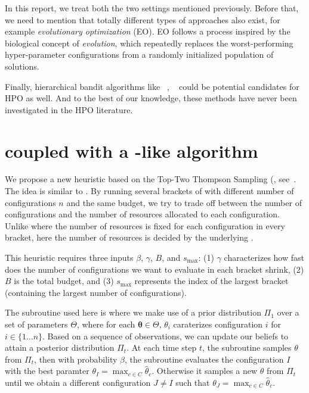 \documentclass[twoside,11pt]{article}
\begin{document}
In this report, we treat both the two settings mentioned previously. Before that, we need to mention that totally different types of approaches also exist, for example \emph{evolutionary optimization} (EO). EO follows a process inspired by the biological concept of \emph{evolution}, which repeatedly replaces the worst-performing hyper-parameter configurations from a randomly initialized population of solutions.

Finally, hierarchical bandit algorithms like \HOO~\citep{bubeck2010x}, \HCT~\citep{azar2014online} could be potential candidates for HPO as well. And to the best of our knowledge, these methods have never been investigated in the HPO literature.

\section{\Hyperband coupled with a \TS-like algorithm}

We propose a new heuristic based on the Top-Two Thompson Sampling (\TTTS, see~\citealt{russo2016ttts}. The idea is similar to \Hyperband. By running several brackets of \TTTS with different number of configurations $n$ and the same budget, we try to trade off between the number of configurations and the number of resources allocated to each configuration. Unlike \Hyperband where the number of resources is fixed for each configuration in every bracket, here the number of resources is decided by the underlying \TS.

This heuristic requires three inputs $\beta$, $\gamma$, $B$, and $s_{\operatorname{max}}$:  (1) $\gamma$ characterizes how fast does the number of configurations we want to evaluate in each bracket shrink, (2) $B$ is the total budget, and (3) $s_{\operatorname{max}}$ represents the index of the largest bracket (containing the largest number of configurations).

The subroutine used here is \TTTS where we make use of a prior distribution $\Pi_1$ over a set of parameters $\Theta$, where for each $\mathbf{\theta}\in\Theta$, $\theta_i$ caraterizes configuration $i$ for $i\in\{1\ldots n\}$. Based on a sequence of observations, we can update our beliefs to attain a posterior distribution $\Pi_t$. At each time step $t$, the subroutine samples $\theta$ from $\Pi_t$, then with probability $\beta$, the subroutine evaluates the configuration $I$ with the best paramter $\theta_I = \max_{c\in C}\hat{\theta}_c$. Otherwise it samples a new $\theta$ from $\Pi_t$ until we obtain a different configuration $J\neq I$ such that $\theta_J = \max_{c\in C}\hat{\theta}_c$.
\end{document}
